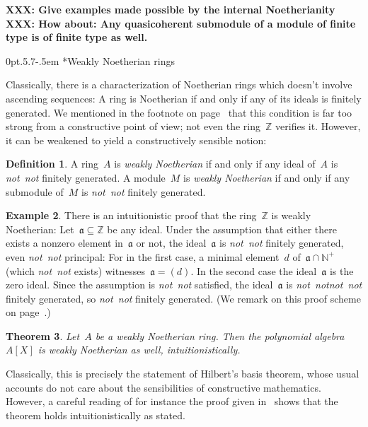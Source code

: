 \documentclass[10pt,reqno,a4paper]{amsbook}
\makeatletter
\theoremstyle{definition}
\newtheorem{defn}{Definition}[section]
\newtheorem{ex}[defn]{Example}
\theoremstyle{plain}
\newtheorem{thm}[defn]{Theorem}
\theoremstyle{remark}
\newcommand{\ZZ}{\mathbb{Z}}
\newcommand{\NN}{\mathbb{N}}
\newcommand{\aaa}{\mathfrak{a}}
\newcommand{\?}{\,{:}\,}
\renewcommand{\_}{\mathpunct{.}\,}
\newcommand{\notnot}{\emph{not~not}\xspace}
\newcommand{\XXX}[1]{\textbf{XXX: #1}}
\renewenvironment{proof}[1][\proofname]{\par
  \pushQED{\qed}%
  \normalfont \topsep6\p@\@plus6\p@\relax
  \trivlist
  \item[\hskip\labelsep
        \itshape
    #1\@addpunct{.}]\ignorespaces
}{%
  \popQED\endtrivlist\@endpefalse
}
\def\subsection{\@startsection{subsection}{2}%
  {0pt}{.5\linespacing\@plus.7\linespacing}{-.5em}%
  {\normalfont\bfseries}}
\makeatother
\begin{document}
{\XXX{Give examples made possible by the internal Noetherianity}
\XXX{How about: Any quasicoherent submodule of a module of finite type is of
finite type as well.}


\subsection*{Weakly Noetherian rings}

Classically, there is a characterization of Noetherian rings which doesn't
involve ascending sequences: A ring is Noetherian if and only if any of its
ideals is finitely generated. We mentioned in the footnote on
page~\pageref{fn:z-principal-ideal-domain} that this condition is far too
strong from a constructive point of view; not even the ring~$\ZZ$ verifies it.
However, it can be weakened to yield a constructively sensible notion:

\begin{defn}A ring~$A$ is \emph{weakly Noetherian} if and only if any ideal
of~$A$ is \notnot finitely generated. A module~$M$ is \emph{weakly Noetherian}
if and only if any submodule of~$M$ is \notnot finitely generated.\end{defn}

\begin{ex}There is an intuitionistic proof that the ring~$\ZZ$ is weakly
Noetherian: Let~$\aaa \subseteq \ZZ$ be any ideal. Under the assumption that
either there exists a nonzero element in~$\aaa$ or not, the ideal~$\aaa$ is
\notnot finitely generated, even \notnot principal: For in the first case, a
minimal element~$d$ of~$\aaa \cap \NN^+$ (which \notnot exists) witnesses~$\aaa
= (d)$. In the second case the ideal~$\aaa$ is the zero ideal. Since the
assumption is \notnot satisfied, the ideal~$\aaa$ is \notnot \notnot finitely
generated, so \notnot finitely generated. (We remark on this proof scheme on
page~\pageref{proof-scheme-boxed-statements}.) \end{ex}

\begin{thm}\label{thm:hilbert}
Let~$A$ be a weakly Noetherian ring. Then the polynomial
algebra~$A[X]$ is weakly Noetherian as well, intuitionistically.
\end{thm}
\begin{proof}Classically, this is precisely the statement of Hilbert's basis
theorem, whose usual accounts do not care about the sensibilities of
constructive mathematics. However, a careful reading of for instance the proof
given in~\cite[Theorem~7.5]{atiyah:macdonald:commutative-algebra} shows that
the theorem holds intuitionistically as stated.
\end{proof}

}
\end{document}

